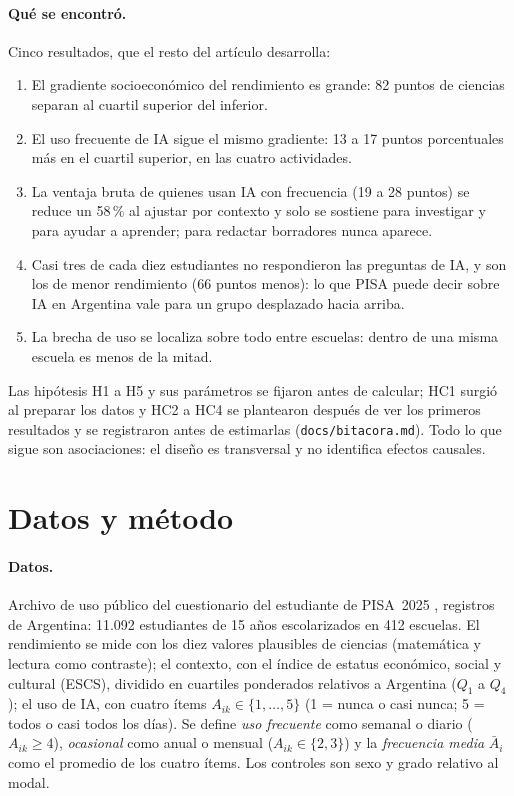 \documentclass[11pt,a4paper]{article}
\newcommand{\arch}[1]{\texttt{\small #1}}
\begin{document}
\paragraph{Qué se encontró.} Cinco resultados, que el resto del artículo desarrolla:
\begin{enumerate}[label=\textbf{\arabic*.},leftmargin=1.6em]
\item El gradiente socioeconómico del rendimiento es grande: 82 puntos de ciencias separan al cuartil superior del inferior.
\item El uso frecuente de IA sigue el mismo gradiente: 13 a 17 puntos porcentuales más en el cuartil superior, en las cuatro actividades.
\item La ventaja bruta de quienes usan IA con frecuencia (19 a 28 puntos) se reduce un 58\,\% al ajustar por contexto y solo se sostiene para investigar y para ayudar a aprender; para redactar borradores nunca aparece.
\item Casi tres de cada diez estudiantes no respondieron las preguntas de IA, y son los de menor rendimiento (66 puntos menos): lo que PISA puede decir sobre IA en Argentina vale para un grupo desplazado hacia arriba.
\item La brecha de uso se localiza sobre todo entre escuelas: dentro de una misma escuela es menos de la mitad.
\end{enumerate}

\noindent Las hipótesis H1 a H5 y sus parámetros se fijaron antes de calcular; HC1 surgió al preparar los datos y HC2 a HC4 se plantearon después de ver los primeros resultados y se registraron antes de estimarlas (\arch{docs/bitacora.md}). Todo lo que sigue son asociaciones: el diseño es transversal y no identifica efectos causales.

\section{Datos y método}\label{sec:metodo}

\paragraph{Datos.} Archivo de uso público del cuestionario del estudiante de PISA~2025 \parencite{oecd2025db}, registros de Argentina: 11.092 estudiantes de 15 años escolarizados en 412 escuelas. El rendimiento se mide con los diez valores plausibles de ciencias (matemática y lectura como contraste); el contexto, con el índice de estatus económico, social y cultural (ESCS), dividido en cuartiles ponderados relativos a Argentina ($Q_1$ a $Q_4$); el uso de IA, con cuatro ítems $A_{ik}\in\{1,\dots,5\}$ (1 = nunca o casi nunca; 5 = todos o casi todos los días). Se define \emph{uso frecuente} como semanal o diario ($A_{ik}\ge4$), \emph{ocasional} como anual o mensual ($A_{ik}\in\{2,3\}$) y la \emph{frecuencia media} $\bar A_i$ como el promedio de los cuatro ítems. Los controles son sexo y grado relativo al modal.
\end{document}
